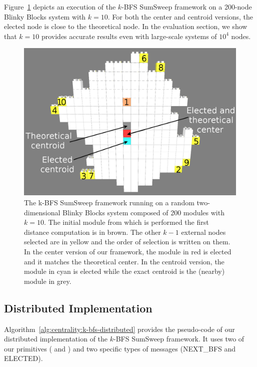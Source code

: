 Figure~\ref{fig:centrality:k-bfs} depicts an execution of the $k$-BFS SumSweep framework on a 200-node Blinky Blocks system with $k = 10$. For both the center and centroid versions, the elected node is close to the theoretical node. In the evaluation section, we show that $k = 10$ provides accurate results even with large-scale systems of $10^4$ nodes.

\begin{figure}[!h]
	\centering
	\includegraphics[width=0.75\linewidth]{images/centrality/k-bfs-sumsweep}
	\caption{The k-BFS SumSweep framework running on a random two-dimensional Blinky Blocks system composed of 200 modules with $k= 10$. The initial module from which is performed the first distance computation is in brown. The other $k-1$ external nodes selected are in yellow and the order of selection is written on them. In the center version of our framework, the  module in red is elected and it matches the theoretical center. In the centroid version, the module in cyan is elected while the exact centroid is the (nearby) module in grey.\label{fig:centrality:k-bfs}}
\end{figure}

\subsection{Distributed Implementation}

Algorithm~\ref{alg:centrality:k-bfs-distributed} provides the pseudo-code of our distributed implementation of the $k$-BFS SumSweep framework. It uses two of our primitives (\cheungIeCbAgg{} and \cheungCbAgg{}) and two specific types of messages (NEXT\_BFS and ELECTED).


